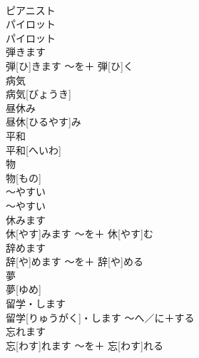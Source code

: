 \documentclass[8pt]{extreport}
\begin{document}
\begin{CJK}{UTF8}{min}
\\	ピアニスト		
\\	パイロット	
\\	パイロット		
\\	弾きます	
\\	弾[ひ]きます	〜を＋ 弾[ひ]く	
\\	病気	
\\	病気[びょうき]		
\\	昼休み	
\\	昼休[ひるやす]み		
\\	平和	
\\	平和[へいわ]		
\\	物	
\\	物[もの]		
\\	〜やすい	
\\	〜やすい		
\\	休みます	
\\	休[やす]みます	〜を＋ 休[やす]む	
\\	辞めます	
\\	辞[や]めます	〜を＋ 辞[や]める	
\\	夢	
\\	夢[ゆめ]		
\\	留学・します	
\\	留学[りゅうがく]・します	〜へ／に＋する	
\\	忘れます	
\\	忘[わす]れます	〜を＋ 忘[わす]れる	
\end{CJK}
\end{document}
